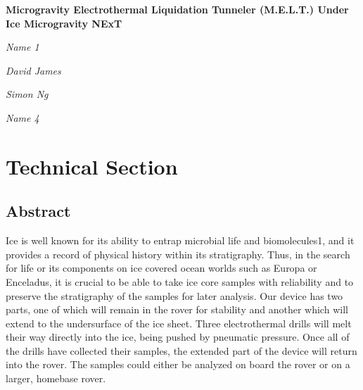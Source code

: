 \documentclass{article}
\begin{document}
\begin{titlepage}
\begin{center}

    \vspace{3cm}
    {\huge\bfseries Microgravity Electrothermal Liquidation Tunneler (M.E.L.T.) Under Ice Microgravity NExT\par}
    \vspace{10cm}
    {\Large\itshape Name 1\par}
    {\Large\itshape David James\par}
    {\Large\itshape Simon Ng\par}
    {\Large\itshape Name 4\par}

\end{center}
\end{titlepage}

\begin{titlepage}
\tableofcontents
\end{titlepage}

\section{Technical Section}
\subsection{Abstract}
Ice is well known for its ability to entrap microbial life and biomolecules1, and it provides a record of physical history within its stratigraphy. Thus, in the search for life or its components on ice covered ocean worlds such as Europa or Enceladus, it is crucial to be able to take ice core samples with reliability and to preserve the stratigraphy of the samples for later analysis. Our device has two parts, one of which will remain in the rover for stability and another which will extend to the undersurface of the ice sheet. Three electrothermal drills will melt their way directly into the ice, being pushed by pneumatic pressure. Once all of the drills have collected their samples, the extended part of the device will return into the rover. The samples could either be analyzed on board the rover or on a larger, homebase rover.
\end{document}
